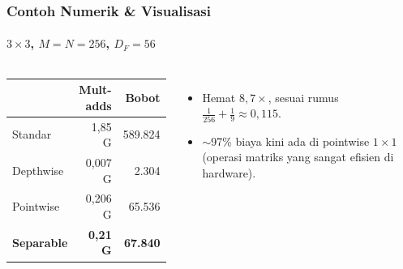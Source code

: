 \documentclass[t,aspectratio=169,xcolor=dvipsnames]{beamer}
\begin{document}
\begin{frame}
    \frametitle{Contoh Numerik \& Visualisasi}
    \framesubtitle{$3\times3$, $M=N=256$, $D_F=56$}
    \footnotesize

    \begin{columns}[T]
        \vspace{4pt}
        \begin{center}
        \begin{tabular}{lrr}
            \toprule
             & \textbf{Mult-adds} & \textbf{Bobot} \\
            \midrule
            Standar & 1,85 G & 589.824 \\
            Depthwise & 0,007 G & 2.304 \\
            Pointwise & 0,206 G & 65.536 \\
            \midrule
            \textbf{Separable} & \textbf{0,21 G} & \textbf{67.840} \\
            \bottomrule
        \end{tabular}
        \end{center}
        \vspace{0.1cm}
        \begin{itemize}
            \item Hemat \textbf{$8{,}7\times$}, sesuai rumus $\tfrac{1}{256}+\tfrac{1}{9}\approx 0{,}115$.
            \item $\sim$97\% biaya kini ada di pointwise $1\times1$ (operasi matriks yang sangat efisien di hardware).
        \end{itemize}


\end{columns}
\end{frame}
\end{document}
